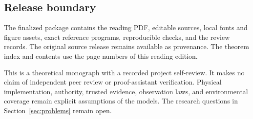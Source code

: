 \subsection*{Release boundary}
The finalized package contains the reading PDF, editable sources, local fonts and figure assets, exact reference programs, reproducible checks, and the review records. The original source release remains available as provenance. The theorem index and contents use the page numbers of this reading edition.

This is a theoretical monograph with a recorded project self-review. It makes no claim of independent peer review or proof-assistant verification. Physical implementation, authority, trusted evidence, observation laws, and environmental coverage remain explicit assumptions of the models. The research questions in Section~\ref{sec:problems} remain open.
